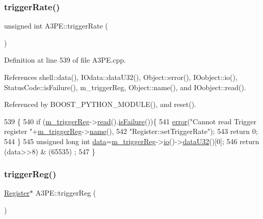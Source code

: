 \subsubsection{\texorpdfstring{trigger\+Rate()}{triggerRate()}}
{\footnotesize\ttfamily unsigned int A3\+P\+E\+::trigger\+Rate (\begin{DoxyParamCaption}{ }\end{DoxyParamCaption})}



Definition at line 539 of file A3\+P\+E.\+cpp.



References shell\+::data(), I\+Odata\+::data\+U32(), Object\+::error(), I\+Oobject\+::io(), Status\+Code\+::is\+Failure(), m\+\_\+trigger\+Reg, Object\+::name(), and I\+Oobject\+::read().



Referenced by B\+O\+O\+S\+T\+\_\+\+P\+Y\+T\+H\+O\+N\+\_\+\+M\+O\+D\+U\+L\+E(), and reset().


\begin{DoxyCode}
539                               \{
540   \textcolor{keywordflow}{if} (\hyperlink{classA3PE_a750158ae488121ab7969452f061e678c}{m\_triggerReg}->\hyperlink{classIOobject_aa07610c11963b1db6710e3c76ceea456}{read}().\hyperlink{classStatusCode_a5dd22dc6eb2c52fc4cabc58f6dea2eb7}{isFailure}())\{
541     \hyperlink{classObject_a204a95f57818c0f811933917a30eff45}{error}(\textcolor{stringliteral}{"Cannot read Trigger register "}+\hyperlink{classA3PE_a750158ae488121ab7969452f061e678c}{m\_triggerReg}->\hyperlink{classObject_a300f4c05dd468c7bb8b3c968868443c1}{name}(),
542         \textcolor{stringliteral}{"Register::setTriggerRate"});
543     \textcolor{keywordflow}{return} 0;
544   \}
545   \textcolor{keywordtype}{unsigned} \textcolor{keywordtype}{long} \textcolor{keywordtype}{int} \hyperlink{namespaceshell_a5ea2525995cedc3efd69ea8a7f034d1e}{data}=\hyperlink{classA3PE_a750158ae488121ab7969452f061e678c}{m\_triggerReg}->\hyperlink{classIOobject_af04fb94137c3d86849f478ac5afab5d1}{io}()->\hyperlink{classIOdata_ab0e3cd09f46c1c3712f797116f6da074}{dataU32}()[0];
546   \textcolor{keywordflow}{return} (data>>8) & (65535) ; 
547 \}
\end{DoxyCode}
\mbox{\label{classA3PE_a4bf922f391fee6753fb0d53e133603b7}} 
\subsubsection{\texorpdfstring{trigger\+Reg()}{triggerReg()}}
{\footnotesize\ttfamily \hyperlink{classRegister}{Register}$\ast$ A3\+P\+E\+::trigger\+Reg (\begin{DoxyParamCaption}{ }\end{DoxyParamCaption})\hspace{0.3cm}{\ttfamily [inline]}}



